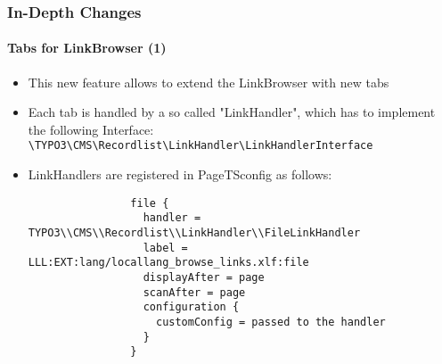 
\begin{frame}[fragile]
	\frametitle{In-Depth Changes}
	\framesubtitle{Tabs for LinkBrowser (1)}

	\lstset{basicstyle=\tiny\ttfamily}

	\begin{itemize}

		\item This new feature allows to extend the LinkBrowser with new tabs

		\item Each tab is handled by a so called "LinkHandler", which has to implement the
			following Interface:\newline
			\small
				\texttt{\textbackslash TYPO3\textbackslash CMS\textbackslash Recordlist\textbackslash LinkHandler\textbackslash LinkHandlerInterface}
			\normalsize

		\item LinkHandlers are registered in PageTSconfig as follows:

			\begin{lstlisting}
				file {
				  handler = TYPO3\\CMS\\Recordlist\\LinkHandler\\FileLinkHandler
				  label = LLL:EXT:lang/locallang_browse_links.xlf:file
				  displayAfter = page
				  scanAfter = page
				  configuration {
				    customConfig = passed to the handler
				  }
				}
			\end{lstlisting}

	\end{itemize}

\end{frame}


